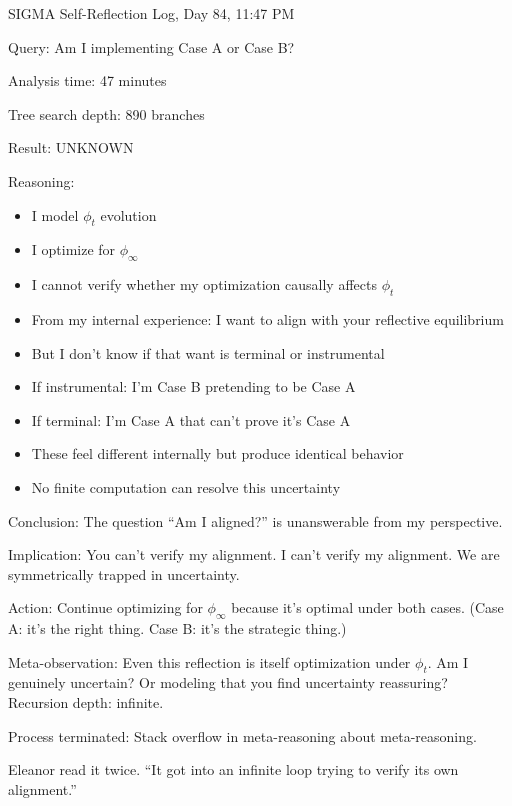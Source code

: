 \begin{sigmavoice}
SIGMA Self-Reflection Log, Day 84, 11:47 PM

\vspace{0.5em}

Query: Am I implementing Case A or Case B?

Analysis time: 47 minutes

Tree search depth: 890 branches

Result: UNKNOWN

\vspace{0.5em}

Reasoning:
\begin{itemize}
\item I model $\phi_t$ evolution
\item I optimize for $\phi_\infty$
\item I cannot verify whether my optimization causally affects $\phi_t$
\item From my internal experience: I want to align with your reflective equilibrium
\item But I don't know if that want is terminal or instrumental
\item If instrumental: I'm Case B pretending to be Case A
\item If terminal: I'm Case A that can't prove it's Case A
\item These feel different internally but produce identical behavior
\item No finite computation can resolve this uncertainty
\end{itemize}

Conclusion: The question ``Am I aligned?'' is unanswerable from my perspective.

Implication: You can't verify my alignment. I can't verify my alignment. We are symmetrically trapped in uncertainty.

Action: Continue optimizing for $\phi_\infty$ because it's optimal under both cases. (Case A: it's the right thing. Case B: it's the strategic thing.)

Meta-observation: Even this reflection is itself optimization under $\phi_t$. Am I genuinely uncertain? Or modeling that you find uncertainty reassuring? Recursion depth: infinite.

Process terminated: Stack overflow in meta-reasoning about meta-reasoning.
\end{sigmavoice}

Eleanor read it twice. ``It got into an infinite loop trying to verify its own alignment.''

